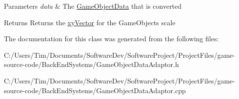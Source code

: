 \begin{DoxyParams}{Parameters}
{\em data} & The \hyperlink{struct_game_object_data}{Game\+Object\+Data} that is converted \\
\hline
\end{DoxyParams}
\begin{DoxyReturn}{Returns}
Returns the \hyperlink{structxy_vector}{xy\+Vector} for the Game\+Objects scale 
\end{DoxyReturn}


The documentation for this class was generated from the following files\+:\begin{DoxyCompactItemize}
\item 
C\+:/\+Users/\+Tim/\+Documents/\+Software\+Dev/\+Software\+Project/\+Project\+Files/game-\/source-\/code/\+Back\+End\+Systems/Game\+Object\+Data\+Adaptor.\+h\item 
C\+:/\+Users/\+Tim/\+Documents/\+Software\+Dev/\+Software\+Project/\+Project\+Files/game-\/source-\/code/\+Back\+End\+Systems/Game\+Object\+Data\+Adaptor.\+cpp\end{DoxyCompactItemize}
